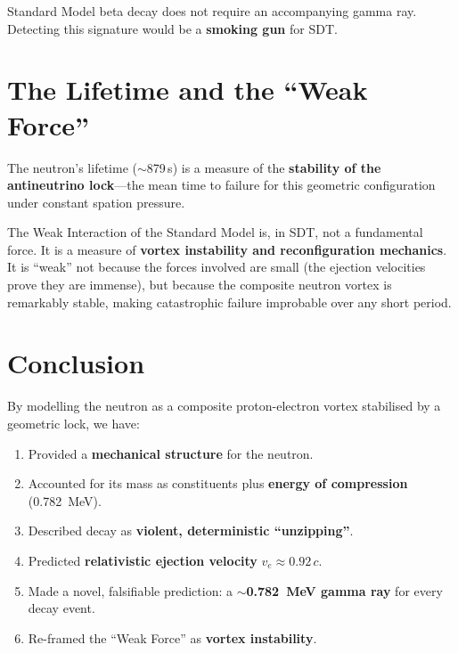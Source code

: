 Standard Model beta decay does not require an accompanying gamma ray.  Detecting this signature would be a \textbf{smoking gun} for SDT.


\section{The Lifetime and the ``Weak Force''}

The neutron's lifetime ($\sim$879\,s) is a measure of the \textbf{stability of the antineutrino lock}---the mean time to failure for this geometric configuration under constant spation pressure.

The Weak Interaction of the Standard Model is, in SDT, not a fundamental force.  It is a measure of \textbf{vortex instability and reconfiguration mechanics}.  It is ``weak'' not because the forces involved are small (the ejection velocities prove they are immense), but because the composite neutron vortex is remarkably stable, making catastrophic failure improbable over any short period.


\section{Conclusion}

By modelling the neutron as a composite proton-electron vortex stabilised by a geometric lock, we have:
\begin{enumerate}
  \item Provided a \textbf{mechanical structure} for the neutron.
  \item Accounted for its mass as constituents plus \textbf{energy of compression} (0.782~MeV).
  \item Described decay as \textbf{violent, deterministic ``unzipping''}.
  \item Predicted \textbf{relativistic ejection velocity} $v_e \approx 0.92\,c$.
  \item Made a novel, falsifiable prediction: a \textbf{$\sim$0.782~MeV gamma ray} for every decay event.
  \item Re-framed the ``Weak Force'' as \textbf{vortex instability}.
\end{enumerate}
